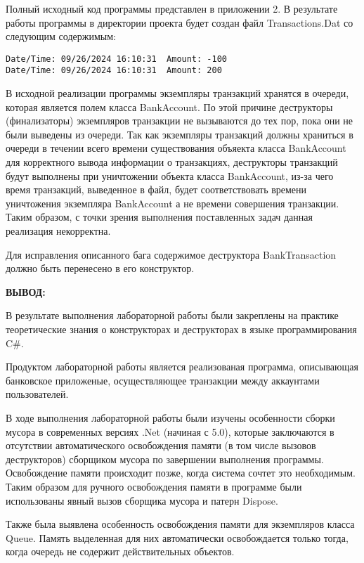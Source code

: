     Полный исходный код программы представлен в приложении 2.
    В результате работы программы в директории проекта будет создан файл Transactions.Dat со следующим содержимым:
     
\begingroup
\fontsize{12pt}{12pt}\selectfont
\linespread{1.5}
\begin{verbatim}
Date/Time: 09/26/2024 16:10:31	Amount: -100
Date/Time: 09/26/2024 16:10:31	Amount: 200
\end{verbatim}  
\endgroup

    В исходной реализации программы экземпляры транзакций хранятся в очереди, которая является полем класса BankAccount.
    По этой причине деструкторы (финализаторы) экземпляров транзакции не вызываются до тех пор, пока они не были выведены из очереди.
    Так как экземпляры транзакций должны храниться в очереди в течении всего времени существования объяекта класса BankAccount для корректного вывода информации о транзакциях, деструкторы транзакций будут выполнены при уничтожении объекта класса BankAccount, из-за чего время транзакций, выведенное в файл, будет соответствовать времени уничтожения экземпляра BankAccount а не времени совершения транзакции.
    Таким образом, с точки зрения выполнения поставленных задач данная реализация некорректна.
    
    Для исправления описанного бага содержимое деструктора BankTransaction должно быть перенесено в его конструктор.


\newpage
{\bfseries {ВЫВОД:}}

В результате выполнения лабораторной работы были закреплены на практике теоретические знания о конструкторах и деструкторах в языке программирования C\#.

Продуктом лабораторной работы является реализованая программа, описывающая банковское приложеные, осуществляющее транзакции между аккаунтами пользователей.

В ходе выполнения лабораторной работы были изучены особенности сборки мусора в современных версиях .Net (начиная с 5.0), которые заключаются в отсутствии автоматического освобождения памяти (в том числе вызовов деструкторов) сборщиком мусора по завершении выполнения программы.
Освобождение памяти происходит позже, когда система сочтет это необходимым. 
Таким образом для ручного освобождения памяти в программе были использованы явный вызов сборщика мусора и патерн Dispose.

Также была выявлена особенность освобождения памяти для экземпляров класса Queue. 
Память выделенная для них автоматически освобождается только тогда, когда очередь не содержит действительных объектов.
